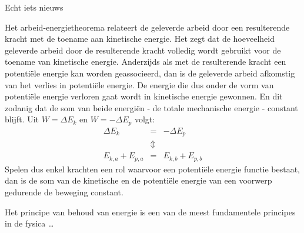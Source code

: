 \documentclass{ximera}
\begin{document}
	\author{Bart Lambregs}
    \xmsource\xmuitleg

Echt iets nieuws



	Het arbeid-energietheorema relateert de geleverde arbeid door een resulterende kracht met de toename aan kinetische energie. Het zegt dat de hoeveelheid geleverde arbeid door de resulterende kracht volledig wordt gebruikt voor de toename van kinetische energie.
	Anderzijds als met de resulterende kracht een potentiële energie kan worden geassocieerd, dan is de geleverde arbeid afkomstig van het verlies in potentiële energie. De energie die dus onder de vorm van potentiële energie verloren gaat wordt in kine\-ti\-sche energie gewonnen. En dit zodanig dat de som van beide energiën - de totale mechanische energie - constant blijft.
	Uit $W=\Delta E_k$ en $W=-\Delta E_p$ volgt:
	\begin{eqnarray}
	\Delta E_k&=&-\Delta E_p\nonumber\\
	&\Updownarrow&\nonumber\\
	E_{k,a}+E_{p,a}&=&E_{k,b}+E_{p,b}\nonumber
	\end{eqnarray}
	Spelen dus enkel krachten een rol waarvoor een potentiële energie functie bestaat, dan is de som van de kinetische en de potentiële energie van een voorwerp gedurende de beweging constant.
	
	
	Het principe van behoud van energie is een van de meest fundamentele principes in de fysica \ldots 
	
	
\end{document}
